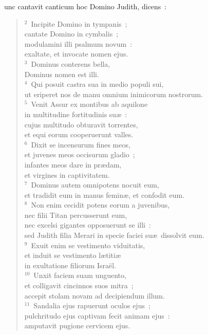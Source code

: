 \bchapter
{}unc cantavit canticum hoc Domino Judith, dicens~:
\begin{verse}${}^{2}$~Incipite Domino in tympanis~;\\ cantate Domino in cymbalis~;\\ modulamini illi psalmum novum~:\\ exaltate, et invocate nomen ejus.\\
${}^{3}$~Dominus conterens bella,\\ Dominus nomen est illi.\\
${}^{4}$~Qui posuit castra sua in medio populi sui,\\ ut eriperet nos de manu omnium inimicorum nostrorum.\\
${}^{5}$~Venit Assur ex montibus ab aquilone\\ in multitudine fortitudinis su\ae~:\\ cujus multitudo obturavit torrentes,\\ et equi eorum cooperuerunt valles.\\
${}^{6}$~Dixit se incensurum fines meos,\\ et juvenes meos occisurum gladio~;\\ infantes meos dare in pr\ae dam,\\ et virgines in captivitatem.\\
${}^{7}$~Dominus autem omnipotens nocuit eum,\\ et tradidit eum in manus femin\ae , et confodit eum.\\
${}^{8}$~Non enim cecidit potens eorum a juvenibus,\\ nec filii Titan percusserunt eum,\\ nec excelsi gigantes opposuerunt se illi~:\\ sed Judith filia Merari in specie faciei su\ae\ dissolvit eum.\\
${}^{9}$~Exuit enim se vestimento viduitatis,\\ et induit se vestimento l\ae titi\ae \\ in exultatione filiorum Isra\"el.\\
${}^{10}$~Unxit faciem suam unguento,\\ et colligavit cincinnos suos mitra~;\\ accepit stolam novam ad decipiendum illum.\\
${}^{11}$~Sandalia ejus rapuerunt oculos ejus~;\\ pulchritudo ejus captivam fecit animam ejus~:\\ amputavit pugione cervicem ejus.\\

\end{verse}

